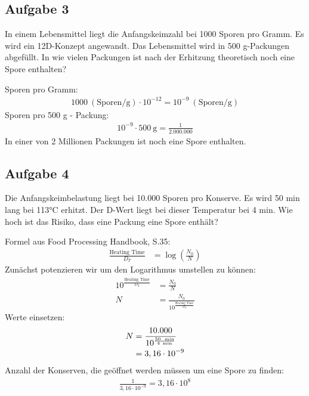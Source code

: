 \documentclass[a4paper,10pt]{article}
\begin{document}
\pp
\subsection{Aufgabe 3}
In einem Lebensmittel liegt die Anfangskeimzahl bei 1000 Sporen pro Gramm. Es wird ein 12D-Konzept angewandt. Das Lebensmittel wird in 500 g-Packungen abgefüllt. In wie
vielen Packungen ist nach der Erhitzung theoretisch noch eine Spore enthalten?
\pp

Sporen pro Gramm:
\begin{align*}
1000 ~(\text{Sporen} /\text{g}) \cdot 10^{-12} = 10^{-9} ~(\text{Sporen} /\text{g})
\end{align*}
Sporen pro 500 g - Packung:
\begin{align*}
10^{-9} \cdot 500 ~\text{g} = \frac{1}{2.000.000}
\end{align*}
In einer von 2 Millionen Packungen ist noch eine Spore enthalten.
\pp

\subsection{Aufgabe 4}
Die Anfangskeimbelastung liegt bei 10.000 Sporen pro Konserve. Es wird 50 min lang bei
113°C erhitzt. Der D-Wert liegt bei dieser Temperatur bei 4 min. Wie hoch ist das Risiko,
dass eine Packung eine Spore enthält?
\pp

Formel aus Food Processing Handbook, S.35:
\begin{align}
\frac{\text{Heating Time}}{D_T} &= \log(\frac{N_0}{N}) 
\end{align}
Zunächst potenzieren wir um den Logarithmus umstellen zu können:
\begin{align*}
10^{\frac{\text{Heating Time}}{D_T}} &= \frac{N_0}{N} \\
N &= \frac{N_0}{10^{\frac{\text{Heating Time}}{D_T}}}
\end{align*}
Werte einsetzen:
\begin{align*}
N &= \frac{10.000}{10^{\frac{\text{50 ~\text{min}}}{4 ~\text{min}}}} \\
 &= 3,16 \cdot 10^{-9}
\end{align*}
Anzahl der Konserven, die geöffnet werden müssen um eine Spore zu finden:
\begin{align*}
\frac{1}{3,16 \cdot 10^{-9}} = 3,16 \cdot 10^{8}
\end{align*}
\pp
\end{document}
